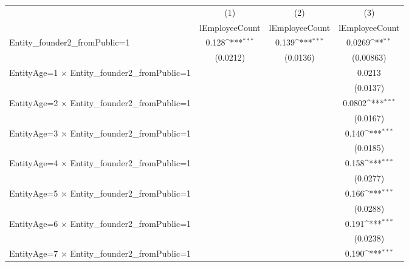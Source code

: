 {
\def\sym#1{\ifmmode^{#1}\else\(^{#1}\)\fi}
\begin{tabular}{l*{3}{c}}
\hline\hline
                    &\multicolumn{1}{c}{(1)}&\multicolumn{1}{c}{(2)}&\multicolumn{1}{c}{(3)}\\
                    &\multicolumn{1}{c}{lEmployeeCount}&\multicolumn{1}{c}{lEmployeeCount}&\multicolumn{1}{c}{lEmployeeCount}\\
\hline
Entity\_founder2\_fromPublic=1&       0.128\sym{***}&       0.139\sym{***}&      0.0269\sym{**} \\
                    &    (0.0212)         &    (0.0136)         &   (0.00863)         \\
[1em]
EntityAge=1 $\times$ Entity\_founder2\_fromPublic=1&                     &                     &      0.0213         \\
                    &                     &                     &    (0.0137)         \\
[1em]
EntityAge=2 $\times$ Entity\_founder2\_fromPublic=1&                     &                     &      0.0802\sym{***}\\
                    &                     &                     &    (0.0167)         \\
[1em]
EntityAge=3 $\times$ Entity\_founder2\_fromPublic=1&                     &                     &       0.140\sym{***}\\
                    &                     &                     &    (0.0185)         \\
[1em]
EntityAge=4 $\times$ Entity\_founder2\_fromPublic=1&                     &                     &       0.158\sym{***}\\
                    &                     &                     &    (0.0277)         \\
[1em]
EntityAge=5 $\times$ Entity\_founder2\_fromPublic=1&                     &                     &       0.166\sym{***}\\
                    &                     &                     &    (0.0288)         \\
[1em]
EntityAge=6 $\times$ Entity\_founder2\_fromPublic=1&                     &                     &       0.191\sym{***}\\
                    &                     &                     &    (0.0238)         \\
[1em]
EntityAge=7 $\times$ Entity\_founder2\_fromPublic=1&                     &                     &       0.190\sym{***}\\

\end{tabular}}
